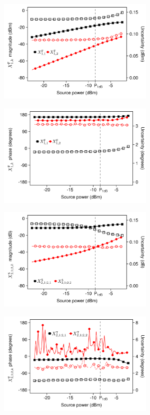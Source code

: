 \documentclass[../thesis/thesis.tex]{subfiles}
\begin{document}
\begin{figure}
	\centering
	\begin{subfigure}{0.45\textwidth}
		\includegraphics[width=\linewidth,height=5cm]{fig4a}			
		\label{ch5_fig_FB1kdB}
	\end{subfigure}\hfil%
	\begin{subfigure}{0.45\textwidth}
		\includegraphics[width=\linewidth,height=5cm]{fig4b}
		\label{ch5_fig_FB1kp}
	\end{subfigure}
	\begin{subfigure}{0.45\textwidth}
		\includegraphics[width=\linewidth,height=5cm]{fig4c}
		\label{ch5_fig_s212kdB}
	\end{subfigure}\hfil%
	\begin{subfigure}{0.45\textwidth}
		\includegraphics[width=\linewidth,height=5cm]{fig4d}	

\end{subfigure}
\end{figure}
\end{document}
